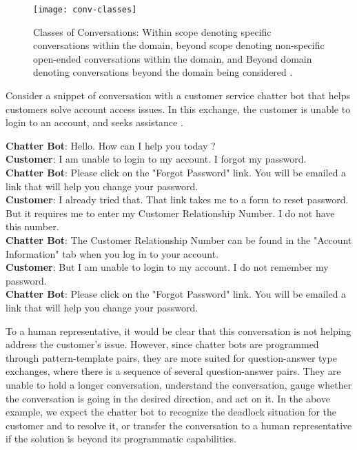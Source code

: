 \begin{figure}[htb]
	\centering
	\texttt{[image: conv-classes]}
	\caption{Classes of Conversations: Within scope denoting specific conversations
within the domain, beyond scope denoting non-specific open-ended conversations
within the domain, and Beyond domain denoting conversations beyond the domain
being considered \cite{chakrabarti2015}.}
	\label{personal-info}
\end{figure}

Consider a snippet of conversation with a customer service chatter bot that helps customers solve account access issues. In this exchange, the customer is unable to login to an account, and seeks assistance \cite{chakrabarti2015}.\\

{ \selectfont

  \color{red}
  \textbf{Chatter Bot}: Hello. How can I help you today ?\\
  
  \color{blue}
  \textbf{Customer}: I am unable to login to my account. I forgot my password.\\
  
  \color{red}
  \textbf{Chatter Bot}: Please click on the "Forgot Password" link. You will be emailed a link that will help you change your password.\\
  
  \color{blue}
  \textbf{Customer}: I already tried that. That link takes me to a form to reset password. But it requires me to enter my Customer Relationship Number. I do not have this number.\\
  
  \color{red}
  \textbf{Chatter Bot}: The Customer Relationship Number can be found in the "Account Information" tab when you log in to your account.\\
  
  \color{blue}
  \textbf{Customer}: But I am unable to login to my account. I do not remember my password.\\
  
  \color{red}
  \textbf{Chatter Bot}: Please click on the "Forgot Password" link. You will be emailed a link that will help you change your password.\\
  
  \color{black}
}

To a human representative, it would be clear that this conversation is not helping address the customer’s issue. However, since chatter bots are programmed through pattern-template pairs, they are more suited for question-answer type exchanges, where there is a sequence of several question-answer pairs. They are unable to hold a longer conversation, understand the conversation, gauge whether the conversation is going in the desired direction, and act on it. In the above example, we expect the chatter bot to recognize the deadlock situation for the customer and to resolve it, or transfer the conversation to a human representative if the solution is beyond its programmatic capabilities.

